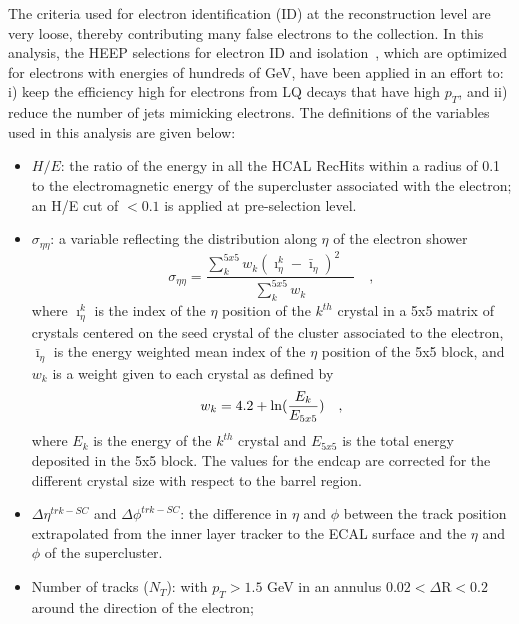 The criteria used for electron identification (ID) at the reconstruction level are very loose, thereby contributing many false electrons 
to the collection. In this analysis, the HEEP selections for electron ID and isolation~\cite{HEEPNOTE}, which are optimized for 
electrons with energies of hundreds of GeV, have been applied in an effort to: i) keep the efficiency high for electrons 
from LQ decays that have high $p_{T}$, and ii) reduce the number of jets mimicking electrons.
The definitions of the variables used in this analysis are given below:
%
\begin{itemize}
%
\item $H/E$: the ratio of the energy in all the HCAL RecHits within a radius of 0.1 to 
the electromagnetic energy of the supercluster associated with the electron; 
an H/E cut of $<0.1$ is applied at pre-selection level.
%
\item $\sigma_{\eta\eta}$: a variable reflecting the distribution along $\eta$ of the electron shower 
\begin{displaymath}
\sigma_{\eta\eta} = \frac{\sum_k^{5x5} w_k( \imath_{\eta}^k - \bar{\imath}_{\eta} )^2 \quad}{\sum_k^{5x5} w_k} \quad ,
\end{displaymath}
where $\imath_{\eta}^k$ is the index of the $\eta$ position of the $k^{th}$ crystal 
in a 5x5 matrix of crystals centered on the seed crystal of the 
cluster associated to the electron, 
$\bar{\imath}_{\eta}$ is the energy weighted mean 
index of the $\eta$ position of the 5x5 block, 
and $w_k$ is a weight given to each crystal as defined by
\begin{displaymath}
w_k = 4.2 + {\rm ln} (\frac{E_k}{E_{5x5}}) \quad , 
\end{displaymath}
where $E_k$ is the energy of the $k^{th}$ crystal and $E_{5x5}$ is the total energy deposited in the 5x5 block.
The values for the endcap are corrected for the different crystal size with respect to the barrel region.
%
\item $\Delta\eta^{trk-SC}$ and $\Delta\phi^{trk-SC}$: the difference in $\eta$ and $\phi$ between the track position extrapolated from 
the inner layer tracker to the ECAL surface and the $\eta$ and $\phi$ of the supercluster.
%
\item Number of tracks ($N_T$): with $p_{T}>1.5$ GeV in an annulus $0.02 < \Delta\mbox{R} < 0.2 $ around the direction of the electron;

\end{itemize}
